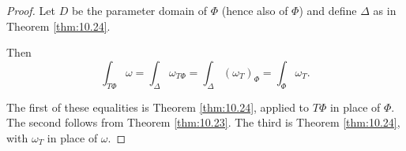 \begin{proof}
    Let $D$ be the parameter domain of $\Phi$ (hence also of $\Phi$) and define $\Delta$ as in Theorem \ref{thm:10.24}.

    Then 
    \begin{equation*}
        \int_{T \Phi} \omega = 
        \int_{\Delta} \omega_{T \Phi} = 
        \int_{\Delta} (\omega_{T})_{\Phi} = 
        \int_{\Phi} \omega_{T} .
    \end{equation*}

    The first of these equalities is Theorem \ref{thm:10.24}, applied to $T\Phi$ in place of $\Phi$. 
    The second follows from Theorem \ref{thm:10.23}. The third is Theorem \ref{thm:10.24},
    with $\omega_T$ in place of $\omega$.
\end{proof}